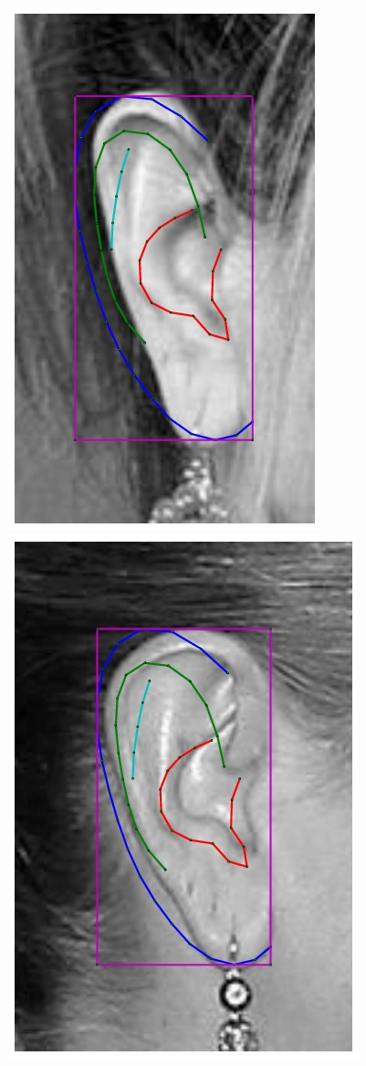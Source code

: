 \begin{figure}
    \hfill
    \includegraphics[height=\flowh]{resources/Ear_Deformable_Model/fittings/initial_0007}
    \hfill
    \includegraphics[height=\flowh]{resources/Ear_Deformable_Model/fittings/initial_0008}

\end{figure}
